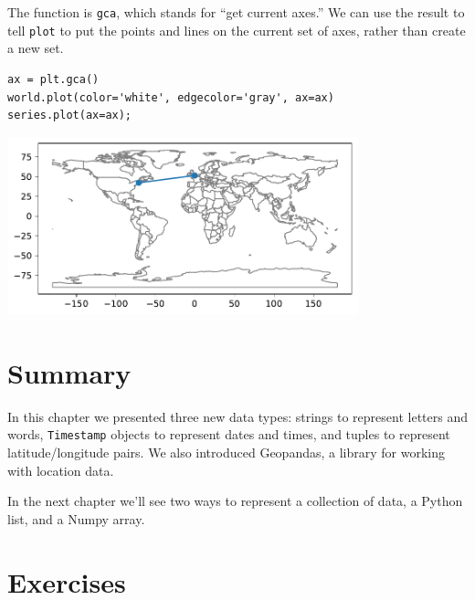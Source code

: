 The function is \passthrough{\lstinline!gca!}, which stands for ``get
current axes.'' We can use the result to tell
\passthrough{\lstinline!plot!} to put the points and lines on the
current set of axes, rather than create a new set.

\begin{lstlisting}[]
ax = plt.gca()
world.plot(color='white', edgecolor='gray', ax=ax)
series.plot(ax=ax);
\end{lstlisting}

\begin{center}
\includegraphics[width=4in]{chapters/02_times_files/02_times_130_0.pdf}
\end{center}

\hypertarget{summary}{%
\section{Summary}\label{summary}}

In this chapter we presented three new data types: strings to represent letters
and words, \passthrough{\lstinline!Timestamp!} objects to represent
dates and times, and tuples to represent latitude/longitude pairs. We also introduced Geopandas, a library for working with location data.

In the next chapter we'll see two ways to represent a collection of
data, a Python list, and a Numpy array.
\hypertarget{exercises}{%
\section{Exercises}\label{exercises}}

